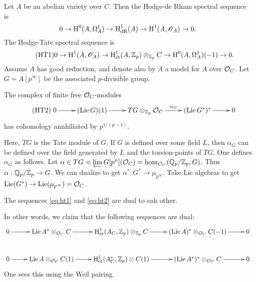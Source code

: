 \begin{example}
Let $A$ be an abelian variety over $C$. Then the Hodge-de Rham spectral sequence 
is 
\[
  0 \to \operatorname{H}^0(A,\Omega_A^1) \to \operatorname{H}_\text{dR}^1(A) \to \operatorname{H}^1(A,\mathscr{O}_A) \to 0 .
\]
The Hodge-Tate spectral sequence is 
\begin{equation*}\tag{HT1}\label{eq:ht1}
  0 \to \operatorname{H}^1(A,\mathscr{O}_A) \to \operatorname{H}_{\textnormal{\'et}}^1(A,\mathbb{Z}_p)\otimes_{\mathbb{Z}_p} C \to \operatorname{H}^0(A,\Omega_A^1)(-1) \to 0 .
\end{equation*}
Assume $A$ has good reduction, and denote also by $A$ a model for $A$ over 
$\mathcal{O}_C$. Let $G=A[p^\infty]$ be the associated $p$-divisible group. 
\end{example}

\begin{theorem}
The complex of finite free $\mathcal{O}_C$-modules 
\begin{equation*}\tag{HT2}\label{eq:ht2}
\xymatrix{
  0 \ar[r] 
    & (\operatorname{Lie} G)(1) \ar[r] 
    & T G\otimes_{\dZ_p} \cO_C \ar[r]^-{\alpha_G} 
    &(\operatorname{Lie} G^\ast)^\ast \ar[r] 
    & 0
}
\end{equation*}
has cohomology annhiliated by $p^{1/(p-1)}$. 
\end{theorem}

Here, $T G$ is the Tate module of $G$. If $G$ is defined over some field $L$, then 
$\alpha_G$ can be defined over the field generated by $L$ and the torsion-points of 
$T G$. One defines $\alpha_G$ as follows. Let 
$\alpha\in T G=\varprojlim G[p^n](\mathcal{O}_C) = \hom_{\mathcal{O}_C}(\mathbb{Q}_p/\mathbb{Z}_p,G)$. Thus 
$\alpha:\mathbb{Q}_p/\mathbb{Z}_p \to G$. We can dualize to get 
$\alpha^\ast:G^\ast \to \mu_{p^\infty}$. Take Lie algebras to get 
$\operatorname{Lie}(G^\ast) \to \operatorname{Lie}(\mu_{p^\infty}) = \mathcal{O}_C$. 

\begin{theorem}
The sequences \eqref{eq:ht1} and \eqref{eq:ht2} are dual to eah other. 
\end{theorem}
In other words, we claim that the following sequences are dual:
\[\xymatrix{
  0 \ar[r] 
    & \operatorname{Lie} A^\ast\otimes_{\cO_C} C \ar[r] 
    & \h_\et^1(A_C,\dZ_p)\otimes_{\dZ_p} C \ar[r] 
    & (\operatorname{Lie} A)^\ast\otimes_{\cO_C} C(-1) \ar[r] 
    & 0 \\
  0 \ar[r] 
    & \operatorname{Lie} A\otimes_{\cO_C} C(1) \ar[r] 
    & \h_\et^1(A_C^\ast,\dZ_p)\otimes C(1) \ar[r] 
    & (\operatorname{Lie} A^\ast)^\ast \otimes_{\cO_C} C \ar[r] 
    & 0
}\]
One sees this using the Weil pairing. 


